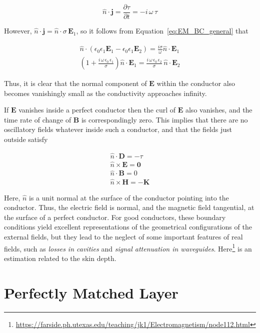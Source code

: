 \documentclass[
  notoc %
]{tufte-book}
\DeclareRobustCommand{\href}[2]{#2\footnote{\url{#1}}}
\begin{document}
\[
\hat{n}\cdot\mathbf{j} = \frac{\partial\tau}{\partial t} = -i\, \omega\,\tau
\]

However, \(\hat{n}\cdot\mathbf{j} = \hat{n}\cdot\sigma \,\mathbf{E}_1\),
so it follows from Equation~\ref{eq:EM_BC_general} that

\[
\begin{aligned}
\hat{n}\cdot(\epsilon_0\epsilon_1\mathbf{E}_1 - \epsilon_0\epsilon_1\mathbf{E}_2) = \frac{i\sigma}{\omega}\hat{n}\cdot\mathbf{E}_1 \\
\left(1+ \frac{i\,\omega\,\epsilon_0\,\epsilon_1}{\sigma}\right)\hat{n}\cdot\mathbf{E}_1 = \frac{i\,\omega\, \epsilon_0\,\epsilon_2}{\sigma}\,\hat{n}\cdot\mathbf{E}_2
\end{aligned}
\]

Thus, it is clear that the normal component of \(\mathbf{E}\) within the
conductor also becomes vanishingly small as the conductivity approaches
infinity.

If \(\mathbf{E}\) vanishes inside a perfect conductor then the curl of
\(\mathbf{E}\) also vanishes, and the time rate of change of
\(\mathbf{B}\) is correspondingly zero. This implies that there are no
oscillatory fields whatever inside such a conductor, and that the fields
just outside satisfy

\[
\begin{aligned}
\hat{n}\cdot\mathbf{D}= -\tau \\
\hat{n}\times\mathbf{E}=\mathbf{0} \\
\hat{n}\cdot\mathbf{B}=0 \\
\hat{n}\times\mathbf{H}= -\mathbf{K}
\end{aligned}
\]

Here, \(\hat{n}\) is a unit normal at the surface of the conductor
pointing into the conductor. Thus, the electric field is normal, and the
magnetic field tangential, at the surface of a perfect conductor. For
good conductors, these boundary conditions yield excellent
representations of the geometrical configurations of the external
fields, but they lead to the neglect of some important features of real
fields, such as \emph{losses in cavities} and \emph{signal attenuation
in waveguides}.
\href{https://farside.ph.utexas.edu/teaching/jk1/Electromagnetism/node112.html}{Here}
is an estimation related to the skin depth.

\hypertarget{perfectly-matched-layer}{%
\section{Perfectly Matched Layer}\label{perfectly-matched-layer}}
\end{document}
